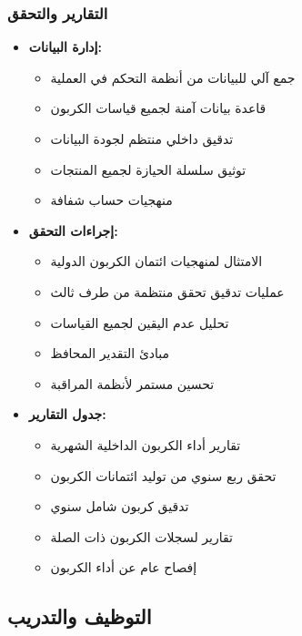 \subsubsection{التقارير والتحقق}
\begin{itemize}
    \item \textbf{إدارة البيانات:}
    \begin{itemize}
        \item جمع آلي للبيانات من أنظمة التحكم في العملية
        \item قاعدة بيانات آمنة لجميع قياسات الكربون
        \item تدقيق داخلي منتظم لجودة البيانات
        \item توثيق سلسلة الحيازة لجميع المنتجات
        \item منهجيات حساب شفافة
    \end{itemize}
    
    \item \textbf{إجراءات التحقق:}
    \begin{itemize}
        \item الامتثال لمنهجيات ائتمان الكربون الدولية
        \item عمليات تدقيق تحقق منتظمة من طرف ثالث
        \item تحليل عدم اليقين لجميع القياسات
        \item مبادئ التقدير المحافظ
        \item تحسين مستمر لأنظمة المراقبة
    \end{itemize}
    
    \item \textbf{جدول التقارير:}
    \begin{itemize}
        \item تقارير أداء الكربون الداخلية الشهرية
        \item تحقق ربع سنوي من توليد ائتمانات الكربون
        \item تدقيق كربون شامل سنوي
        \item تقارير لسجلات الكربون ذات الصلة
        \item إفصاح عام عن أداء الكربون
    \end{itemize}
\end{itemize}

\subsection{التوظيف والتدريب}

